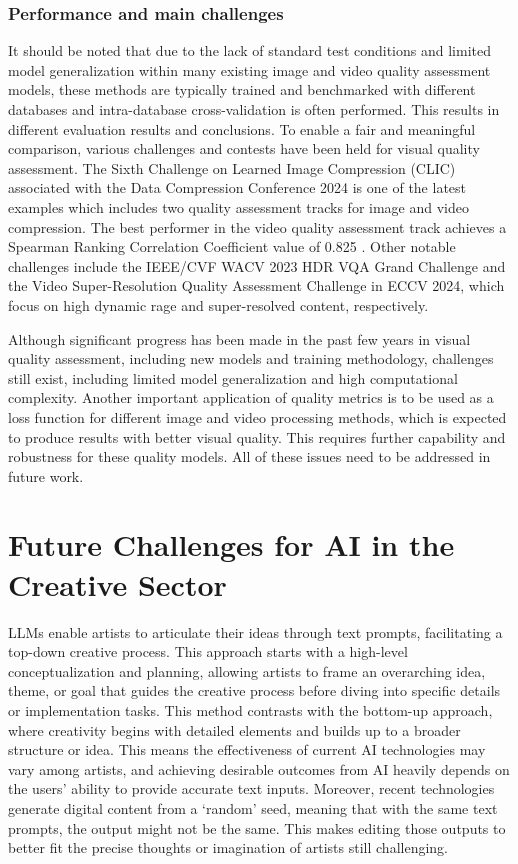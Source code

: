 \documentclass[11pt,a4paper]{article}
\begin{document}
\subsubsection{Performance and main challenges}

It should be noted that due to the lack of standard test conditions and limited model generalization within many existing image and video quality assessment models, these methods are typically trained and benchmarked with different databases and intra-database cross-validation is often performed. This results in different evaluation results and conclusions. To enable a fair and meaningful comparison, various challenges and contests have been held for visual quality assessment. The Sixth Challenge on Learned Image Compression (CLIC) \cite{clic} associated with the Data Compression Conference 2024 is one of the latest examples which includes two quality assessment tracks for image and video compression. The best performer in the video quality assessment track achieves a Spearman Ranking Correlation Coefficient value of 0.825 \cite{feng2024rankdvqa}. Other notable challenges include the IEEE/CVF WACV 2023 HDR VQA Grand Challenge and the Video Super-Resolution Quality Assessment Challenge in ECCV 2024, which focus on high dynamic rage and super-resolved content, respectively. 

Although significant progress has been made in the past few years in visual quality assessment, including new models and training methodology, challenges still exist, including limited model generalization and high computational complexity. Another important application of quality metrics is to be used as a loss function for different image and video processing methods, which is expected to produce results with better visual quality. This requires further capability and robustness for these quality models. All of these issues need to be addressed in future work. 

\section{Future Challenges for AI in the Creative Sector}
\label{sec:discussion}

LLMs enable artists to articulate their ideas through text prompts, facilitating a top-down creative process. This approach starts with a high-level conceptualization and planning, allowing artists to frame an overarching idea, theme, or goal that guides the creative process before diving into specific details or implementation tasks. This method contrasts with the bottom-up approach, where creativity begins with detailed elements and builds up to a broader structure or idea. This means the effectiveness of current AI technologies may vary among artists, and achieving desirable outcomes from AI heavily depends on the users' ability to provide accurate text inputs. Moreover, recent technologies generate digital content from a `random' seed, meaning that with the same text prompts, the output might not be the same. This makes editing those outputs to better fit the precise thoughts or imagination of artists still challenging.
\end{document}
